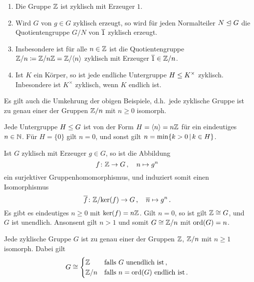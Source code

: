 \begin{example}
  \begin{enumerate}
    \item
      Die Gruppe $\mathbb{Z}$ ist zyklisch mit Erzeuger $1$.
    \item
      Wird $G$ von $g \in G$ zyklisch erzeugt, so wird für jeden Normalteiler $N \mathrel{\trianglelefteq} G$ die Quotientengruppe $G/N$ von $\overline{1}$ zyklisch erzeugt.
    \item
      Insbesondere ist für alle $n \in \mathbb{Z}$ ist die Quotientengruppe $\mathbb{Z}/n \coloneqq \mathbb{Z}/n\mathbb{Z} = \mathbb{Z}/\langle n\rangle$ zyklisch mit Erzeuger $\overline{1} \in \mathbb{Z}/n$.
    \item
      Ist $K$ ein Körper, so ist jede endliche Untergruppe $H \mathrel{\leq} K^\times$ zyklisch.
      Inbesondere ist $K^\times$ zyklisch, wenn $K$ endlich ist.
  \end{enumerate}
\end{example}

Es gilt auch die Umkehrung der obigen Beispiele, d.h.\ jede zyklische Gruppe ist zu genau einer der Gruppen $\mathbb{Z}/n$ mit $n \geq 0$ isomorph.

\begin{lemma}
\label{lemma: subgroups of Z}
  Jede Untergruppe $H \mathrel{\leq} G$ ist von der Form $H = \langle n\rangle = n\mathbb{Z}$ für ein eindeutiges $n \in \mathbb{N}$.
  Für $H = \{0\}$ gilt $n = 0$, und sonst gilt $n = \min \{k > 0 \suchthat k \in H\}$.
\end{lemma}

Ist $G$ zyklisch mit Erzeuger $g \in G$, so ist die Abbildung
\[
          f
  \colon  \mathbb{Z}
  \to     G \,,
  \quad   n
  \mapsto g^n
\]
ein surjektiver Gruppenhomomorphismus, und induziert somit einen Isomorphismus
\[
          \overline{f}
  \colon  \mathbb{Z}/{\ker(f)}
  \to     G \,,
  \quad   \overline{n}
  \mapsto g^n \,.
\]
Es gibt es eindeutiges $n \geq 0$ mit $\ker(f) = n\mathbb{Z}$.
Gilt $n = 0$, so ist gilt $\mathbb{Z} \cong G$, und $G$ ist unendlich.
Ansonsent gilt $n > 1$ und somit $G \cong \mathbb{Z}/n$ mit $\operatorname{ord}(G) = n$.

\begin{corollary}
  Jede zyklische Gruppe $G$ ist zu genau einer der Gruppen $\mathbb{Z}$, $\mathbb{Z}/n$ mit $n \geq 1$ isomorph.
  Dabei gilt
  \[
          G
    \cong \begin{cases}
              \mathbb{Z}
            & \text{falls $G$ unendlich ist} \,,
          \\
              \mathbb{Z}/n
            & \text{falls $n = \operatorname{ord}(G)$ endlich ist} \,.
          \end{cases}
  \]
\end{corollary}

